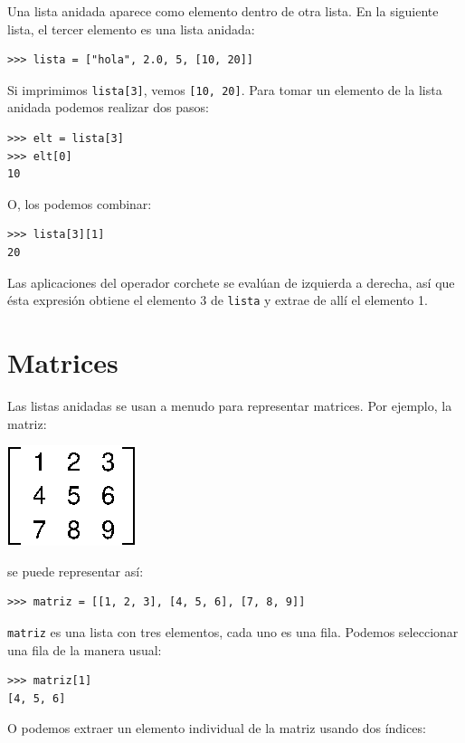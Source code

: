 Una lista anidada aparece como elemento dentro de otra lista.
En la siguiente lista, el tercer elemento es una lista anidada:

\beforeverb
\begin{verbatim}
>>> lista = ["hola", 2.0, 5, [10, 20]]
\end{verbatim}
\afterverb
%
Si imprimimos \texttt{lista[3]}, vemos \texttt{[10, 20]}. Para 
tomar un elemento de la lista anidada podemos realizar dos pasos:

\beforeverb
\begin{verbatim}
>>> elt = lista[3]
>>> elt[0]
10
\end{verbatim}
\afterverb
%
O, los podemos combinar:

\beforeverb
\begin{verbatim}
>>> lista[3][1]
20
\end{verbatim}
\afterverb
%
Las aplicaciones del operador corchete se evalúan de izquierda a derecha, 
así que ésta expresión obtiene el elemento 3 de  \texttt{lista} y
extrae de allí el elemento 1.

\section{Matrices}

Las listas anidadas se usan a menudo para representar matrices.  Por ejemplo,
la matriz:

\beforefig
\centerline{\includegraphics{illustrations/matrix.eps}}
\afterfig

se puede representar así:

\beforeverb
\begin{verbatim}
>>> matriz = [[1, 2, 3], [4, 5, 6], [7, 8, 9]]
\end{verbatim}
\afterverb
%
\texttt{matriz} es una lista con tres elementos, cada uno es una 
fila.  Podemos seleccionar una fila de la manera usual:

\beforeverb
\begin{verbatim}
>>> matriz[1]
[4, 5, 6]
\end{verbatim}
\afterverb
%
O podemos extraer un elemento individual de la matriz usando
dos índices:

